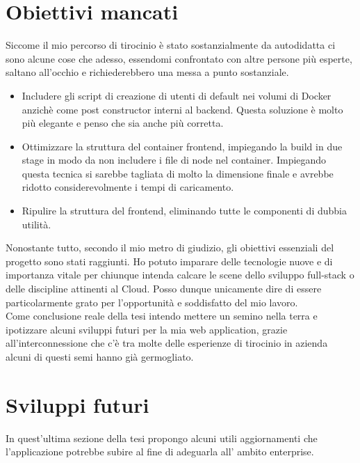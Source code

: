 \section{Obiettivi mancati}
Siccome il mio percorso di tirocinio è stato sostanzialmente da autodidatta ci sono alcune cose che adesso, essendomi confrontato con altre persone più esperte, saltano all'occhio e richiederebbero una messa a punto sostanziale.
\begin{itemize}
    \item Includere gli script di creazione di utenti di default nei volumi di Docker anzichè come post constructor interni al backend. Questa soluzione è molto più elegante e penso che sia anche più corretta.
    \item Ottimizzare la struttura del container frontend, impiegando la build in due stage in modo da non includere i file di node nel container. Impiegando questa tecnica si sarebbe tagliata di molto la dimensione finale e avrebbe ridotto considerevolmente i tempi di caricamento.
    \item Ripulire la struttura del frontend, eliminando tutte le componenti di dubbia utilità.
\end{itemize}
Nonostante tutto, secondo il mio metro di giudizio, gli obiettivi essenziali del progetto sono stati raggiunti. Ho potuto imparare delle tecnologie nuove e di importanza vitale per chiunque intenda calcare le scene dello sviluppo full-stack o delle discipline attinenti al Cloud. Posso dunque unicamente dire di essere particolarmente grato per l'opportunità e soddisfatto del mio lavoro.
\\
Come conclusione reale della tesi intendo mettere un semino nella terra e ipotizzare alcuni sviluppi futuri per la mia web application, grazie all'interconnessione che c'è tra molte delle esperienze di tirocinio in azienda alcuni di questi semi hanno già germogliato.



\section{Sviluppi futuri}
In quest'ultima sezione della tesi propongo alcuni utili aggiornamenti che l'applicazione potrebbe subire al fine di adeguarla all' ambito enterprise.

